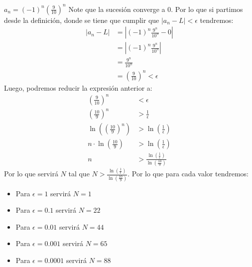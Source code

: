 \documentclass[../main.tex]{subfiles}
\begin{document}
\question $a_n = (-1)^n \left(\frac{9}{10}\right)^n$
Note que la sucesión converge a $0$. Por lo que si partimos desde la definición, donde se tiene que cumplir que $|a_n - L| < \epsilon$ tendremos:
\begin{align*}
    |a_n - L| &= \left|(-1)^n \frac{9^n}{10^n} - 0\right|\\
    &= \left|(-1)^n \frac{9^n}{10^n}\right|\\
    &= \frac{9^n}{10^n}\\
    &= \left(\frac{9}{10}\right)^n < \epsilon
\end{align*}
Luego, podremos reducir la expresión anterior a:
\begin{align*}
    \left(\frac{9}{10}\right)^n &< \epsilon\\
    \left(\frac{10}{9}\right)^n &> \frac{1}{\epsilon}\\
    \ln\left(\left(\frac{10}{9}\right)^n\right) &> \ln\left(\frac{1}{\epsilon}\right)\\
    n \cdot \ln\left(\frac{10}{9}\right) &> \ln\left(\frac{1}{\epsilon}\right)\\
    n &> \frac{\ln\left(\frac{1}{\epsilon}\right)}{\ln\left(\frac{10}{9}\right)}
\end{align*}
Por lo que servirá $N$ tal que $N > \frac{\ln\left(\frac{1}{\epsilon}\right)}{\ln\left(\frac{10}{9}\right)}$. Por lo que para cada valor tendremos:
\begin{itemize}
    \item Para $\epsilon = 1$ servirá $N = 1$
    \item Para $\epsilon = 0.1$ servirá $N = 22$
    \item Para $\epsilon = 0.01$ servirá $N = 44$
    \item Para $\epsilon = 0.001$ servirá $N = 65$
    \item Para $\epsilon = 0.0001$ servirá $N = 88$
\end{itemize}
\end{document}

